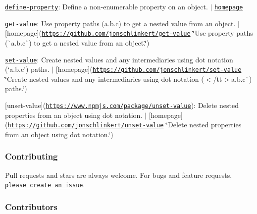 \begin{DoxyItemize}
\item \href{https://www.npmjs.com/package/define-property}{\tt define-\/property}\+: Define a non-\/enumerable property on an object. $\vert$ \href{https://github.com/jonschlinkert/define-property}{\tt homepage}
\item \href{https://www.npmjs.com/package/get-value}{\tt get-\/value}\+: Use property paths ({\ttfamily a.\+b.\+c}) to get a nested value from an object. $\vert$ \mbox{[}homepage\mbox{]}(\href{https://github.com/jonschlinkert/get-value}{\tt https\+://github.\+com/jonschlinkert/get-\/value} \char`\"{}\+Use property paths (\`{}a.\+b.\+c\`{}) to get a nested value from an object.\char`\"{})
\item \href{https://www.npmjs.com/package/set-value}{\tt set-\/value}\+: Create nested values and any intermediaries using dot notation (`\textquotesingle{}a.\+b.\+c'{\ttfamily ) paths. $\vert$ \mbox{[}homepage\mbox{]}(\href{https://github.com/jonschlinkert/set-value}{\tt https\+://github.\+com/jonschlinkert/set-\/value} \char`\"{}\+Create nested values and any intermediaries using dot notation ($<$/tt$>$\textquotesingle{}a.\+b.\+c\textquotesingle{}\`{}) paths.\char`\"{})}
\item {\ttfamily \mbox{[}unset-\/value\mbox{]}(\href{https://www.npmjs.com/package/unset-value}{\tt https\+://www.\+npmjs.\+com/package/unset-\/value})\+: Delete nested properties from an object using dot notation. $\vert$ \mbox{[}homepage\mbox{]}(\href{https://github.com/jonschlinkert/unset-value}{\tt https\+://github.\+com/jonschlinkert/unset-\/value} \char`\"{}\+Delete nested properties from an object using dot notation.\char`\"{})}
\end{DoxyItemize}

{\ttfamily \subsubsection*{Contributing}}

{\ttfamily }

{\ttfamily Pull requests and stars are always welcome. For bugs and feature requests, \href{../../issues/new}{\tt please create an issue}.}

{\ttfamily \subsubsection*{Contributors}}

{\ttfamily }

